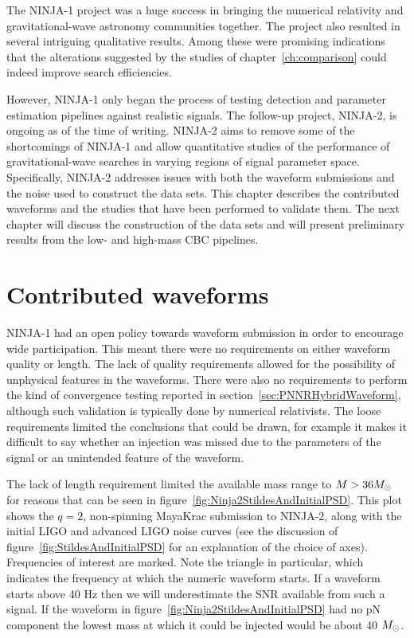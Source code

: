 The NINJA-1 project was a huge success in bringing the numerical
relativity and gravitational-wave astronomy communities together.  The
project also resulted in several intriguing qualitative results.
Among these were promising indications that the alterations suggested 
by the studies of chapter~\ref{ch:comparison} could indeed improve
search efficiencies.

However, NINJA-1 only began the process of testing detection and
parameter estimation pipelines against realistic signals.  The
follow-up project, NINJA-2, is ongoing as of the time of writing.
NINJA-2 aims to remove some of the shortcomings of NINJA-1 and allow
quantitative studies of the performance of gravitational-wave searches
in varying regions of signal parameter space.  Specifically, NINJA-2
addresses issues with both the waveform submissions and the noise used
to construct the data sets.  This chapter describes the contributed
waveforms and the studies that have been performed to validate them.
The next chapter will discuss the construction of the data sets and
will present preliminary results from the low- and high-mass CBC
pipelines.

\section{Contributed waveforms}

NINJA-1 had an open policy towards waveform submission in order to
encourage wide participation.  This meant there were no requirements
on either waveform quality or length.  The lack of quality
requirements allowed for the possibility of unphysical features in the
waveforms.  There were also no requirements to perform the kind of
convergence testing reported in section~\ref{sec:PNNRHybridWaveform},
although such validation is typically done by numerical
relativists.  The loose requirements limited the conclusions that
could be drawn, for example it makes it difficult to say whether an
injection was missed due to the parameters of the signal or an
unintended feature of the waveform.

The lack of length requirement limited the available mass range to $M
> 36 M_\odot$ for reasons that can be seen in
figure~\ref{fig:Ninja2StildesAndInitialPSD}.  This plot shows the
$q=2$, non-spinning MayaKrac submission to NINJA-2, along with the
initial LIGO and advanced LIGO noise curves (see the discussion of
figure~\ref{fig:StildesAndInitialPSD} for an explanation of the choice
of axes).  Frequencies of interest are marked.  Note the triangle in
particular, which indicates the frequency at which the numeric
waveform starts.  If a waveform starts above 40 Hz then we will
underestimate the SNR available from such a signal.  If the
waveform in figure~\ref{fig:Ninja2StildesAndInitialPSD} had no 
pN component the lowest mass at which it could be injected would be
about 40 $M_\odot$.


